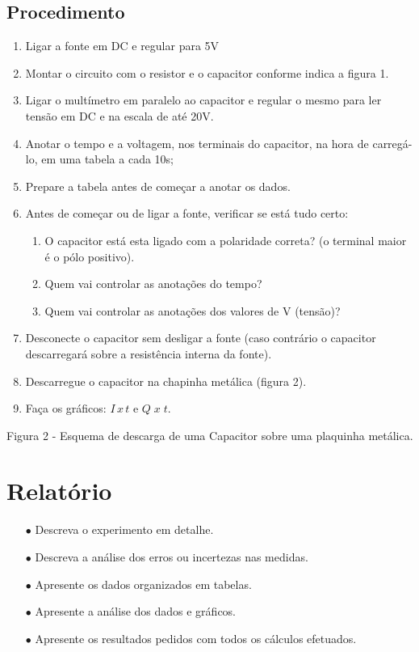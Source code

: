 \documentclass[a4paper,12pt]{article}
\begin{document}
\subsection{Procedimento}

\begin{enumerate}  
    \item { Ligar a fonte em DC e regular para 5V }
    \item { Montar o circuito com o resistor e o capacitor conforme indica a figura 1. }
    \item {  Ligar o multímetro em paralelo ao capacitor e regular o mesmo para ler tensão em DC e na escala de até 20V. }
    \item { Anotar o tempo e a voltagem, nos terminais do capacitor, na hora de carregá-lo, em uma tabela a cada 10s; }
    \item { Prepare a tabela antes de começar a anotar os dados.  }
    \item { Antes de começar ou de ligar a fonte, verificar se está tudo certo:   }
    \begin{enumerate} 
        \item{O capacitor está esta ligado com a polaridade correta? (o terminal maior é o pólo positivo).  }
        \item{Quem vai controlar as anotações do tempo? }
        \item{Quem vai controlar as anotações dos valores de V (tensão)? }
    \end{enumerate}

\item{Desconecte o capacitor sem desligar a fonte (caso contrário o capacitor descarregará sobre a resistência interna da fonte). }
\item{Descarregue o capacitor na chapinha metálica (figura 2). }
\item{Faça os gráficos: $I\,x\,t$ e $Q\;x\;t$. }
\end{enumerate}

Figura 2 - Esquema de descarga de uma Capacitor sobre uma plaquinha metálica. 
 
\section{Relatório }
\begin{enumerate} 
    \item[$\bullet$]{ Descreva o experimento em detalhe. }
    \item[$\bullet$]{ Descreva a análise dos erros ou incertezas nas medidas. }
    \item[$\bullet$]{ Apresente os dados organizados em tabelas. }
    \item[$\bullet$]{ Apresente a análise dos dados e gráficos. }
    \item[$\bullet$]{ Apresente os resultados pedidos com todos os cálculos efetuados. }
\end{enumerate} 
\end{document}

